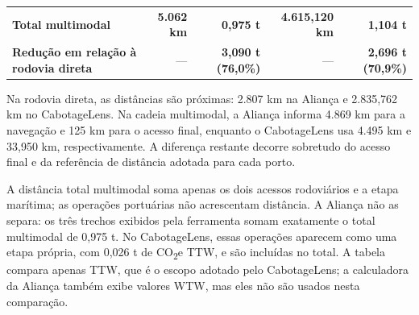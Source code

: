 \documentclass[brazil,]{article}
\begin{document}
\begin{longtable}[]{@{}lrrrr@{}}
\begin{minipage}[t]{0.17\columnwidth}\raggedright
\textbf{Total multimodal}\strut
\end{minipage} & \begin{minipage}[t]{0.17\columnwidth}\raggedleft
\textbf{5.062 km}\strut
\end{minipage} & \begin{minipage}[t]{0.17\columnwidth}\raggedleft
\textbf{0,975 t}\strut
\end{minipage} & \begin{minipage}[t]{0.17\columnwidth}\raggedleft
\textbf{4.615,120 km}\strut
\end{minipage} & \begin{minipage}[t]{0.17\columnwidth}\raggedleft
\textbf{1,104 t}\strut
\end{minipage}\tabularnewline
\begin{minipage}[t]{0.17\columnwidth}\raggedright
\textbf{Redução em relação à rodovia direta}\strut
\end{minipage} & \begin{minipage}[t]{0.17\columnwidth}\raggedleft
---\strut
\end{minipage} & \begin{minipage}[t]{0.17\columnwidth}\raggedleft
\textbf{3,090 t (76,0\%)}\strut
\end{minipage} & \begin{minipage}[t]{0.17\columnwidth}\raggedleft
---\strut
\end{minipage} & \begin{minipage}[t]{0.17\columnwidth}\raggedleft
\textbf{2,696 t (70,9\%)}\strut
\end{minipage}\tabularnewline
\bottomrule
\end{longtable}

Na rodovia direta, as distâncias são próximas: 2.807 km na Aliança e
2.835,762 km no CabotageLens. Na cadeia multimodal, a Aliança informa
4.869 km para a navegação e 125 km para o acesso final, enquanto o
CabotageLens usa 4.495 km e 33,950 km, respectivamente. A diferença
restante decorre sobretudo do acesso final e da referência de distância
adotada para cada porto.

A distância total multimodal soma apenas os dois acessos rodoviários e a
etapa marítima; as operações portuárias não acrescentam distância. A
Aliança não as separa: os três trechos exibidos pela ferramenta somam
exatamente o total multimodal de 0,975 t. No CabotageLens, essas
operações aparecem como uma etapa própria, com 0,026 t de CO\textsubscript{2}e TTW, e
são incluídas no total. A tabela compara apenas TTW, que é o escopo
adotado pelo CabotageLens; a calculadora da Aliança também exibe valores
WTW, mas eles não são usados nesta comparação.
\end{document}
